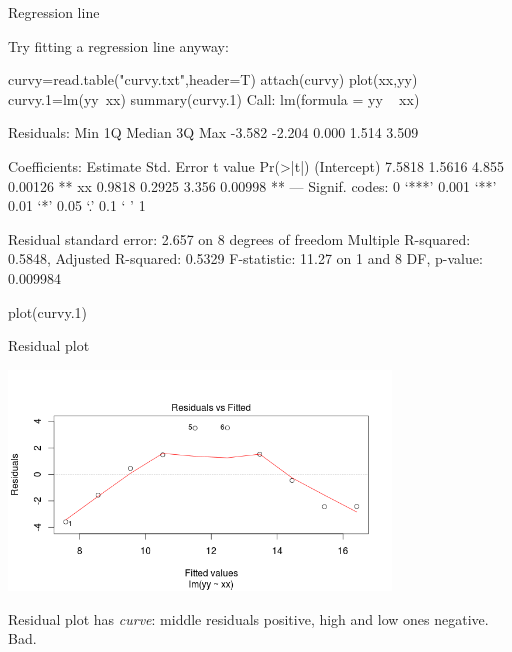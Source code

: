 \begin{frame}[fragile]{Regression line}

Try fitting a regression line anyway:

{\scriptsize
\begin{semiverbatim}
curvy=read.table("curvy.txt",header=T)
attach(curvy)
plot(xx,yy)
curvy.1=lm(yy~xx)
summary(curvy.1)
Call:
lm(formula = yy ~ xx)

Residuals:
   Min     1Q Median     3Q    Max 
-3.582 -2.204  0.000  1.514  3.509 

Coefficients:
            Estimate Std. Error t value Pr(>|t|)   
(Intercept)   7.5818     1.5616   4.855  0.00126 **
xx            0.9818     0.2925   3.356  0.00998 **
---
Signif. codes:  0 ‘***’ 0.001 ‘**’ 0.01 ‘*’ 0.05 ‘.’ 0.1 ‘ ’ 1 

Residual standard error: 2.657 on 8 degrees of freedom
Multiple R-squared: 0.5848,	Adjusted R-squared: 0.5329 
F-statistic: 11.27 on 1 and 8 DF,  p-value: 0.009984 

plot(curvy.1)
\end{semiverbatim}
}
  
\end{frame}



\begin{frame}[fragile]{Residual plot}

\includegraphics[width=4in]{curvy-residual}

Residual plot has {\em curve}: middle residuals positive, high and low ones negative. Bad.
  
\end{frame}

